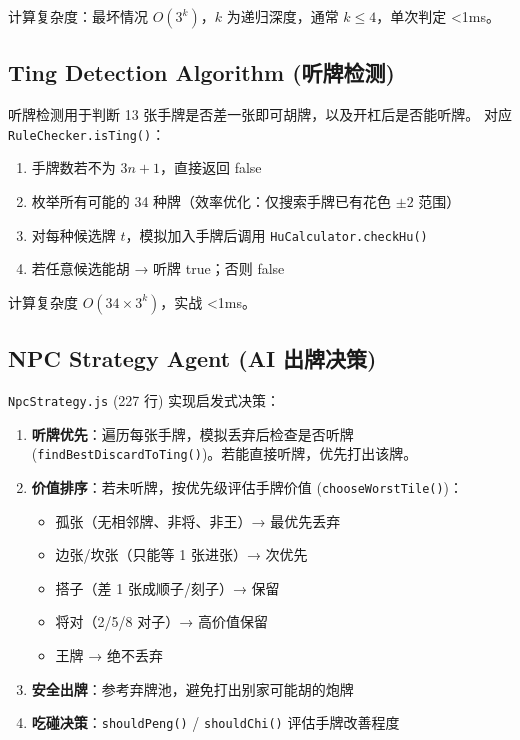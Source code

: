 \documentclass[11pt,a4paper]{article}
\begin{document}
计算复杂度：最坏情况 $O(3^k)$，$k$ 为递归深度，通常 $k \leq 4$，单次判定 <1ms。

\subsection{Ting Detection Algorithm (听牌检测)}

听牌检测用于判断 13 张手牌是否差一张即可胡牌，以及开杠后是否能听牌。
对应 \texttt{RuleChecker.isTing()}：

\begin{enumerate}[nosep]
  \item 手牌数若不为 $3n+1$，直接返回 false
  \item 枚举所有可能的 34 种牌（效率优化：仅搜索手牌已有花色 $\pm 2$ 范围）
  \item 对每种候选牌 $t$，模拟加入手牌后调用 \texttt{HuCalculator.checkHu()}
  \item 若任意候选能胡 → 听牌 true；否则 false
\end{enumerate}

计算复杂度 $O(34 \times 3^k)$，实战 <1ms。

\subsection{NPC Strategy Agent (AI 出牌决策)}

\texttt{NpcStrategy.js} (227 行) 实现启发式决策：

\begin{enumerate}[nosep]
  \item \textbf{听牌优先}：遍历每张手牌，模拟丢弃后检查是否听牌 (\texttt{findBestDiscardToTing()})。若能直接听牌，优先打出该牌。
  \item \textbf{价值排序}：若未听牌，按优先级评估手牌价值 (\texttt{chooseWorstTile()})：
    \begin{itemize}[nosep]
      \item 孤张（无相邻牌、非将、非王）→ 最优先丢弃
      \item 边张/坎张（只能等 1 张进张）→ 次优先
      \item 搭子（差 1 张成顺子/刻子）→ 保留
      \item 将对（2/5/8 对子）→ 高价值保留
      \item 王牌 → 绝不丢弃
    \end{itemize}
  \item \textbf{安全出牌}：参考弃牌池，避免打出别家可能胡的炮牌
  \item \textbf{吃碰决策}：\texttt{shouldPeng()} / \texttt{shouldChi()} 评估手牌改善程度
\end{enumerate}
\end{document}
